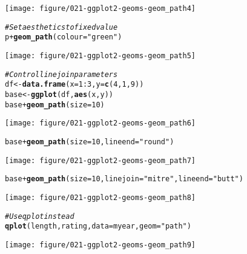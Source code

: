 \documentclass[a4paper,titlepage]{tufte-handout}\usepackage[]{graphicx}\usepackage[]{color}
\makeatletter
\def\maxwidth{ %
  \ifdim\Gin@nat@width>\linewidth
    \linewidth
  \else
    \Gin@nat@width
  \fi
}
\newcommand{\hlnum}[1]{\textcolor[rgb]{0.686,0.059,0.569}{#1}}%
\newcommand{\hlstr}[1]{\textcolor[rgb]{0.192,0.494,0.8}{#1}}%
\newcommand{\hlcom}[1]{\textcolor[rgb]{0.678,0.584,0.686}{\textit{#1}}}%
\newcommand{\hlopt}[1]{\textcolor[rgb]{0,0,0}{#1}}%
\newcommand{\hlstd}[1]{\textcolor[rgb]{0.345,0.345,0.345}{#1}}%
\newcommand{\hlkwb}[1]{\textcolor[rgb]{0.69,0.353,0.396}{#1}}%
\newcommand{\hlkwc}[1]{\textcolor[rgb]{0.333,0.667,0.333}{#1}}%
\newcommand{\hlkwd}[1]{\textcolor[rgb]{0.737,0.353,0.396}{\textbf{#1}}}%
\newenvironment{kframe}{%
 \def\at@end@of@kframe{}%
 \ifinner\ifhmode%
  \def\at@end@of@kframe{\end{minipage}}%
  \begin{minipage}{\columnwidth}%
 \fi\fi%
 \def\FrameCommand##1{\hskip\@totalleftmargin \hskip-\fboxsep
 \colorbox{shadecolor}{##1}\hskip-\fboxsep
     \hskip-\linewidth \hskip-\@totalleftmargin \hskip\columnwidth}%
 \MakeFramed {\advance\hsize-\width
   \@totalleftmargin\z@ \linewidth\hsize
   \@setminipage}}%
 {\par\unskip\endMakeFramed%
 \at@end@of@kframe}
\newenvironment{knitrout}{}{} %
\makeatother
\begin{document}
\begin{knitrout}
\begin{kframe}
\begin{alltt}
\end{alltt}
\end{kframe}
\texttt{[image: figure/021-ggplot2-geoms-geom\_path4]} 
\begin{kframe}\begin{alltt}
\hlcom{# Set aesthetics to fixed value}
\hlstd{p} \hlopt{+} \hlkwd{geom_path}\hlstd{(}\hlkwc{colour} \hlstd{=} \hlstr{"green"}\hlstd{)}
\end{alltt}
\end{kframe}
\texttt{[image: figure/021-ggplot2-geoms-geom\_path5]} 
\begin{kframe}\begin{alltt}
\hlcom{# Control line join parameters}
\hlstd{df} \hlkwb{<-} \hlkwd{data.frame}\hlstd{(}\hlkwc{x} \hlstd{=} \hlnum{1}\hlopt{:}\hlnum{3}\hlstd{,} \hlkwc{y} \hlstd{=} \hlkwd{c}\hlstd{(}\hlnum{4}\hlstd{,} \hlnum{1}\hlstd{,} \hlnum{9}\hlstd{))}
\hlstd{base} \hlkwb{<-} \hlkwd{ggplot}\hlstd{(df,} \hlkwd{aes}\hlstd{(x, y))}
\hlstd{base} \hlopt{+} \hlkwd{geom_path}\hlstd{(}\hlkwc{size} \hlstd{=} \hlnum{10}\hlstd{)}
\end{alltt}
\end{kframe}
\texttt{[image: figure/021-ggplot2-geoms-geom\_path6]} 
\begin{kframe}\begin{alltt}
\hlstd{base} \hlopt{+} \hlkwd{geom_path}\hlstd{(}\hlkwc{size} \hlstd{=} \hlnum{10}\hlstd{,} \hlkwc{lineend} \hlstd{=} \hlstr{"round"}\hlstd{)}
\end{alltt}
\end{kframe}
\texttt{[image: figure/021-ggplot2-geoms-geom\_path7]} 
\begin{kframe}\begin{alltt}
\hlstd{base} \hlopt{+} \hlkwd{geom_path}\hlstd{(}\hlkwc{size} \hlstd{=} \hlnum{10}\hlstd{,} \hlkwc{linejoin} \hlstd{=} \hlstr{"mitre"}\hlstd{,} \hlkwc{lineend} \hlstd{=} \hlstr{"butt"}\hlstd{)}
\end{alltt}
\end{kframe}
\texttt{[image: figure/021-ggplot2-geoms-geom\_path8]} 
\begin{kframe}\begin{alltt}
\hlcom{# Use qplot instead}
\hlkwd{qplot}\hlstd{(length, rating,} \hlkwc{data}\hlstd{=myear,} \hlkwc{geom}\hlstd{=}\hlstr{"path"}\hlstd{)}
\end{alltt}
\end{kframe}
\texttt{[image: figure/021-ggplot2-geoms-geom\_path9]} 

\end{knitrout}
\end{document}
